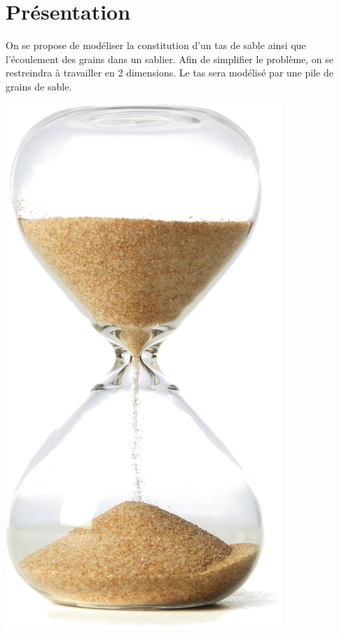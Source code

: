 \documentclass[10pt,fleqn]{article} %
\begin{document}

\vspace{2cm}
\pagestyle{fancy}
\thispagestyle{plain}

\section{Présentation}

\ifprof
\else
\begin{minipage}[c]{.88\linewidth}
On se propose de modéliser la constitution d'un tas de sable ainsi que l'écoulement des grains dans un sablier. Afin de simplifier le problème, on se restreindra à travailler en 2 dimensions. Le tas sera modélisé par une pile de grains de sable. 
\end{minipage} \hfill
\begin{minipage}[c]{.05\linewidth}
\begin{center}
\includegraphics[width=\linewidth]{images/sablier_p}
\end{center}
\end{minipage}
\end{document}
